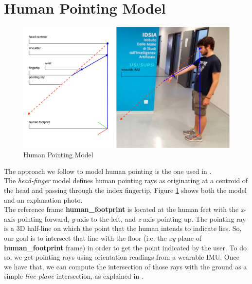 \section{Human Pointing Model} \label{sec:1.2}
\begin{figure}
	\centering
	\includegraphics[width=\textwidth]{img/gabryPointing.png}%
	\caption{Human Pointing Model}
	\label{fig:pointingModel}
\end{figure}
The approach we follow to model human pointing is the one used in \cite{gromov2018robot}. \\
The \emph{head-finger} model defines human pointing rays as originating at a centroid of the head and passing through the index fingertip. Figure \ref{fig:pointingModel} shows both the model and an explanation photo.\\
The reference frame \textbf{human\_footprint} is located at the human feet with the \emph{x}-axis pointing forward, \emph{y}-axis to the left, and \emph{z}-axis pointing up. The pointing ray is a 3D half-line on which the point that the human intends to indicate lies. So, our goal is to intersect that line with the floor (i.e. the \emph{xy}-plane of \textbf{human\_footprint} frame) in order to get the point indicated by the user. To do so, we get pointing rays using orientation readings from a wearable IMU. Once we have that, we can compute the intersection of those rays with the ground as a simple \emph{line-plane} intersection, as explained in \cite{O'Rourke:1998:CGC:289380}.\\

